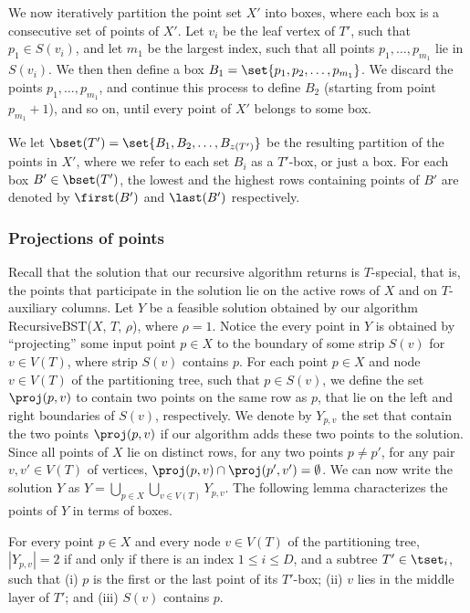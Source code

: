 We now iteratively partition the point set $X'$ into boxes, where each box is a consecutive set of points of $X'$. 
Let $v_i$ be the leaf vertex of $T'$, such that $p_1\in S(v_i)$, and let $m_1$ be the largest index, such that all points $p_1,\ldots,p_{m_1}$ lie in $S(v_i)$. We then then define a box $B_1 = \set{p_1, p_2,\ldots, p_{m_1}}$. We discard the points $p_1,\ldots,p_{m_1}$, and continue this process to define $B_2$ (starting from point $p_{m_1}+1$), and so on, until every point of $X'$ belongs to some box.

%
%

We let $\bset(T') = \set{B_1,B_2,\ldots, B_{z(T')}}$ be the resulting partition of the points in $X'$, where we refer to each set $B_i$ as a $T'$-box, or just a box.
For each box $B' \in \bset(T')$, the lowest and the highest rows containing points of $B'$ are denoted by $\first(B')$ and $\last(B')$ respectively.
 


\subsubsection{Projections of points} 

Recall that the solution that our recursive algorithm returns is $T$-special, that is, the points that participate in the solution lie on the active rows of $X$ and on $T$-auxiliary columns. 
Let $Y$ be a feasible solution obtained by our algorithm {\sc RecursiveBST}($X$, $T$, $\rho$), where $\rho=1$. 
Notice the every point in $Y$ is obtained by ``projecting'' some input point $p \in X$ to the boundary of some strip $S(v)$ for $v \in V(T)$, where strip $S(v)$ contains $p$.  
For each point $p \in X$ and node $v \in V(T)$ of the partitioning tree, such that $p \in S(v)$, we define the set $\proj(p,v)$ to contain two points on the same row as $p$, that lie on the left and right boundaries of $S(v)$, respectively.
We denote by $Y_{p,v}$ the set that contain the two points $\proj(p,v)$ if  our algorithm adds these two points to the solution. Since all points of $X$ lie on distinct rows, for any two points $p\neq p'$, for any pair $v,v'\in V(T)$ of vertices, $\proj(p,v)\cap \proj(p',v')=\emptyset$.
We can now write the solution $Y$ as $Y = \bigcup_{p \in X} \bigcup_{v \in V(T)} Y_{p,v}$.   
%
%
%
The following lemma characterizes the points of $Y$ in terms of boxes.  

\begin{lemma} 
For every point $p \in X$ and every node $v \in V(T)$ of the partitioning tree, $|Y_{p,v}| =2$ if and only if there is an index $1\leq i\leq D$, and a subtree $T' \in \tset_i$, such that (i) $p$ is the first or the last point of its $T'$-box; (ii) $v$ lies in the middle layer of $T'$; and (iii) $S(v)$ contains $p$.
\end{lemma} 

